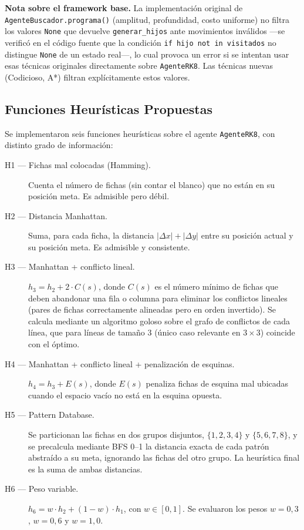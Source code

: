 \documentclass[11pt]{article}
\begin{document}
\textbf{Nota sobre el framework base.} La implementación original de
\texttt{AgenteBuscador.programa()} (amplitud, profundidad, costo uniforme) no
filtra los valores \texttt{None} que devuelve \texttt{generar\_hijos} ante
movimientos inválidos —se verificó en el código fuente que la condición
\texttt{if hijo not in visitados} no distingue \texttt{None} de un estado
real—, lo cual provoca un error si se intentan usar esas técnicas originales
directamente sobre \texttt{AgenteRK8}. Las técnicas nuevas (Codicioso, A*)
filtran explícitamente estos valores.

\subsection{Funciones Heurísticas Propuestas}
Se implementaron seis funciones heurísticas sobre el agente
\texttt{AgenteRK8}, con distinto grado de información:

\begin{description}
\item[H1 --- Fichas mal colocadas (Hamming).] Cuenta el número de fichas (sin
contar el blanco) que no están en su posición meta. Es admisible pero débil.
\item[H2 --- Distancia Manhattan.] Suma, para cada ficha, la distancia
$|\Delta x| + |\Delta y|$ entre su posición actual y su posición meta. Es
admisible y consistente.
\item[H3 --- Manhattan + conflicto lineal.] $h_3 = h_2 + 2\cdot C(s)$, donde
$C(s)$ es el número mínimo de fichas que deben abandonar una fila o columna
para eliminar los conflictos lineales (pares de fichas correctamente
alineadas pero en orden invertido). Se calcula mediante un algoritmo goloso
sobre el grafo de conflictos de cada línea, que para líneas de tamaño 3
(único caso relevante en $3\times 3$) coincide con el óptimo.
\item[H4 --- Manhattan + conflicto lineal + penalización de esquinas.]
$h_4 = h_3 + E(s)$, donde $E(s)$ penaliza fichas de esquina mal ubicadas
cuando el espacio vacío no está en la esquina opuesta.
\item[H5 --- Pattern Database.] Se particionan las fichas en dos grupos
disjuntos, $\{1,2,3,4\}$ y $\{5,6,7,8\}$, y se precalcula mediante BFS 0--1 la
distancia exacta de cada patrón abstraído a su meta, ignorando las fichas del
otro grupo. La heurística final es la suma de ambas distancias.
\item[H6 --- Peso variable.] $h_6 = w\cdot h_2 + (1-w)\cdot h_1$, con
$w \in [0,1]$. Se evaluaron los pesos $w=0{,}3$, $w=0{,}6$ y $w=1{,}0$.
\end{description}
\end{document}

